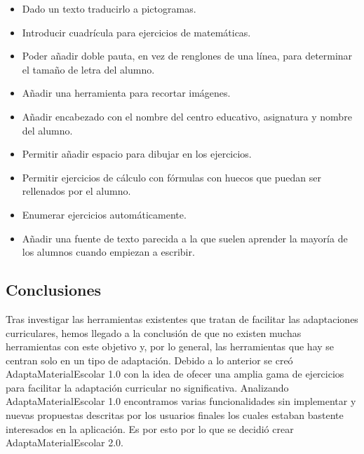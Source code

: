 \begin{itemize}
    \item Dado un texto traducirlo a pictogramas.
    \item Introducir cuadrícula para ejercicios de matemáticas.
    \item Poder añadir doble pauta, en vez de renglones de una línea, para determinar el tamaño de letra del alumno.
    \item Añadir una herramienta para recortar imágenes.
    \item Añadir encabezado con el nombre del centro educativo, asignatura y nombre del alumno.
    \item Permitir añadir espacio para dibujar en los ejercicios.
    \item Permitir ejercicios de cálculo con fórmulas con huecos que puedan ser rellenados por el alumno.
    \item Enumerar ejercicios automáticamente.
    \item Añadir una fuente de texto parecida a la que suelen aprender la mayoría de los alumnos cuando empiezan a escribir.
\end{itemize}

\subsection{Conclusiones}
Tras investigar las herramientas existentes que tratan de facilitar las adaptaciones curriculares, hemos llegado a la conclusión de que no existen muchas herramientas con este objetivo y, por lo general, las herramientas que hay se centran solo en un tipo de adaptación. Debido a lo anterior se creó AdaptaMaterialEscolar 1.0 con la idea de ofecer una amplia gama de ejercicios para facilitar la adaptación curricular no significativa. Analizando AdaptaMaterialEscolar 1.0 encontramos varias funcionalidades sin implementar y nuevas propuestas descritas por los usuarios finales los cuales estaban bastente interesados en la aplicación. Es por esto por lo que se decidió crear AdaptaMaterialEscolar 2.0.